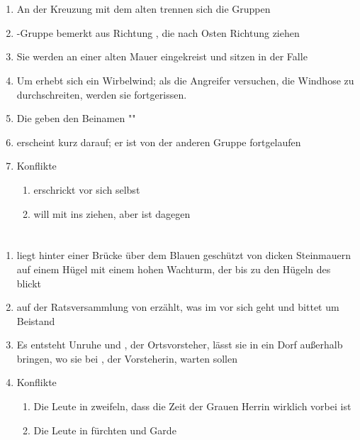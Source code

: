 \documentclass[12pt,a4paper,onecolumn,oneside,ngerman]{book}
\begin{document}
\chapter[Der Weg nach Norden]{}
\begin{enumerate}
  \item An der Kreuzung mit dem alten {\Ternweg} trennen sich die Gruppen
  \item {\Lobarn}-Gruppe bemerkt {\Bangiri} aus Richtung {\Tern}, die nach Osten Richtung {\Lobarn} ziehen
  \item Sie werden an einer alten Mauer eingekreist und sitzen in der Falle
  \item Um {\Sena} erhebt sich ein Wirbelwind; als die Angreifer versuchen, die Windhose zu durchschreiten, werden sie fortgerissen. 
  \item Die {\Schattenlaufer} geben {\Sena} den Beinamen "{\Sturmkind}"
  \item {\Molitor} erscheint kurz darauf; er ist von der anderen Gruppe fortgelaufen
  \item Konflikte
  \begin{enumerate}
    \item {\Sena} erschrickt vor sich selbst
    \item {\Molitor} will mit ins {\Rhinland} ziehen, aber {\Nox} ist dagegen
  \end{enumerate}
\end{enumerate}

\chapter[Neuigkeiten]{}
\begin{enumerate}
  \item {\Lobarn} liegt hinter einer Brücke über dem Blauen {\Rhin} geschützt von dicken Steinmauern auf einem Hügel mit einem hohen Wachturm, der bis zu den Hügeln des {\Enland} blickt
  \item {\Eno} auf der Ratsversammlung von {\Lobarn} erzählt, was im {\Enland} vor sich geht und bittet um Beistand
  \item Es entsteht Unruhe und {\Vester}, der Ortsvorsteher, lässt sie in ein Dorf außerhalb bringen, wo sie bei {\Naimo}, der Vorsteherin, warten sollen
  \item Konflikte
  \begin{enumerate}
    \item Die Leute in {\Lobarn} zweifeln, dass die Zeit der Grauen Herrin wirklich vorbei ist
    \item Die Leute in {\Lobarn} fürchten {\Bangiri} und Garde
  \end{enumerate}
\end{enumerate}
\end{document}

